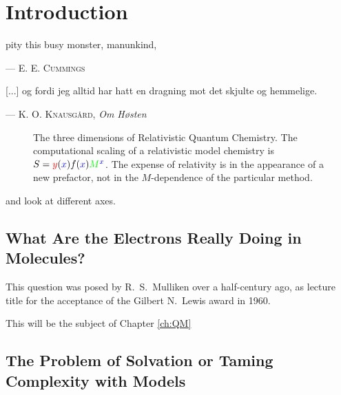 \chapter*{Introduction}

\renewcommand{\thefigure}{\Alph{figure}}

\epigraph{
pity this busy monster, manunkind,
    }{
    --- \textsc{E. E. Cummings}}

\epigraph{
[...] og fordi jeg alltid har hatt en dragning mot det skjulte og hemmelige.
    }{
    --- \textsc{K. O. Knausgård}, \textit{Om Høsten}}

\begin{figure}[tb]
\centering
\scalebox{0.8}{}
\caption{The three dimensions of Relativistic Quantum Chemistry. The computational scaling of a relativistic model chemistry is
$ S=\textcolor{red}{y}(\textcolor{blue}{x})f(\textcolor{blue}{x})\textcolor{green}{M}^{\textcolor{blue}{x}} $. The expense of relativity is in
the appearance of a new prefactor, not in the $M$-dependence of the particular method.}
\label{fig:RQC-axis}
\end{figure}
and look at different axes.

\section*{What Are the Electrons Really Doing in Molecules?}


This question was posed by R.~S.~Mulliken over a half-century ago, as
lecture title for the acceptance of the Gilbert N.~Lewis award in 1960.

This will be the subject of Chapter \ref{ch:QM}

\section*{The Problem of Solvation or Taming Complexity with Models}


